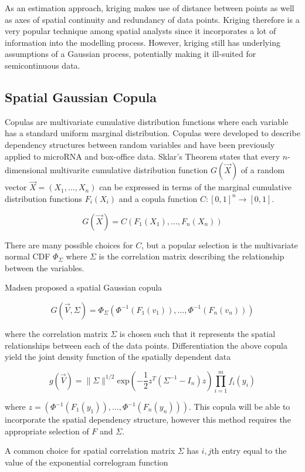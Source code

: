 \documentclass{article}
\begin{document}
As an estimation approach, kriging makes use of distance between points as well as axes of spatial continuity and redundancy of data points.
Kriging therefore is a very popular technique among spatial analysts since it incorporates a lot of information into the modelling process.
However, kriging still has underlying assumptions of a Gaussian process, potentially making it ill-suited for semicontinuous data.

\subsection{Spatial Gaussian Copula}
Copulas are multivariate cumulative distribution functions where each variable has a standard uniform marginal distribution.
Copulas were developed to describe dependency structures between random variables and have been previously applied to microRNA\cite{gaynanova18} and box-office data\cite{duan17}.
Sklar's Theorem states that every $n$-dimensional multivarite cumulative distribution function $G(\vec{X})$ of a random vector $\vec{X} = (X_1, \ldots ,X_n)$ can be expressed in terms of the marginal cumulative distribution functions $F_i(X_i)$ and a copula function $C: [0,1]^n \rightarrow [0,1]$.

$$
G(\vec{X}) = C(F_1(X_1), \ldots, F_n(X_n))
$$

There are many possible choices for $C$, but a popular selection is the multivariate normal CDF $\Phi_{\Sigma}$ where $\Sigma$ is the correlation matrix describing the relationship between the variables.

Madsen\cite{madsen09} proposed a spatial Gaussian copula

$$
G(\vec{V}, \Sigma) = \Phi_{\Sigma}(\Phi^{-1}(F_1(v_1)), \ldots, \Phi^{-1}(F_n(v_n)))
$$

where the correlation matrix $\Sigma$ is chosen such that it represents the spatial relationships between each of the data points.
Differentiation the above copula yield the joint density function of the spatially dependent data

$$
g(\vec{V}) = \| \Sigma \|^{1/2} \text{exp}\left(-\frac{1}{2} z^T (\Sigma^{-1} - I_n) z\right) \prod_{i = 1}^m f_i(y_i)
$$

where $z = (\Phi^{-1}(F_1(y_1)), \ldots, \Phi^{-1}(F_n(y_n)))$.
This copula will be able to incorporate the spatial dependency structure, however this method requires the appropriate selection of $F$ and $\Sigma$.

A common choice for spatial correlation matrix $\Sigma$ has $i,j$th entry equal to the value of the exponential correlogram function
\end{document}
